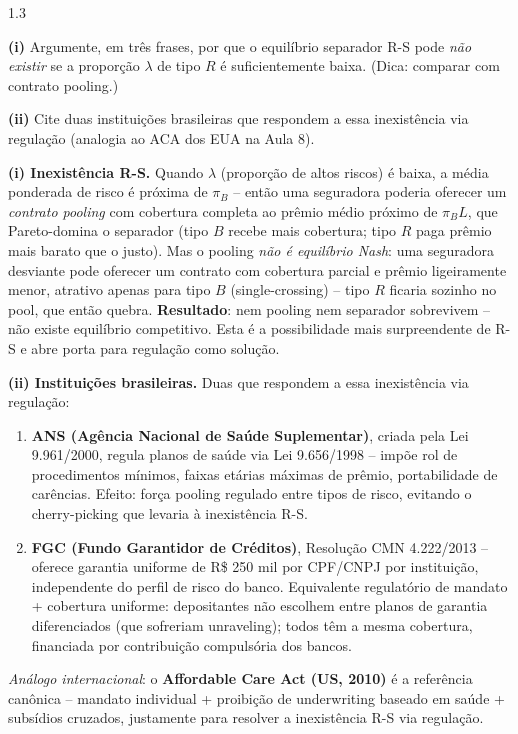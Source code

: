 \documentclass[11pt,addpoints]{exam}
\begin{document}
\begin{spacing}{1.3}
\begin{questions}
\begin{parts}
\textbf{(i)} Argumente, em três frases, por que o equilíbrio separador R-S pode \emph{não existir} se a proporção $\lambda$ de tipo $R$ é suficientemente baixa. (Dica: comparar com contrato pooling.)

\textbf{(ii)} Cite duas instituições brasileiras que respondem a essa inexistência via regulação (analogia ao ACA dos EUA na Aula 8).

\begin{solution}
\textbf{(i) Inexistência R-S.} Quando $\lambda$ (proporção de altos riscos) é baixa, a média ponderada de risco é próxima de $\pi_B$ -- então uma seguradora poderia oferecer um \emph{contrato pooling} com cobertura completa ao prêmio médio próximo de $\pi_B L$, que Pareto-domina o separador (tipo $B$ recebe mais cobertura; tipo $R$ paga prêmio mais barato que o justo). Mas o pooling \emph{não é equilíbrio Nash}: uma seguradora desviante pode oferecer um contrato com cobertura parcial e prêmio ligeiramente menor, atrativo apenas para tipo $B$ (single-crossing) -- tipo $R$ ficaria sozinho no pool, que então quebra. \textbf{Resultado}: nem pooling nem separador sobrevivem -- não existe equilíbrio competitivo. Esta é a possibilidade mais surpreendente de R-S e abre porta para regulação como solução.

\textbf{(ii) Instituições brasileiras.} Duas que respondem a essa inexistência via regulação:
\begin{enumerate}[noitemsep,topsep=0pt,leftmargin=*]
    \item \textbf{ANS (Agência Nacional de Saúde Suplementar)}, criada pela Lei 9.961/2000, regula planos de saúde via Lei 9.656/1998 -- impõe rol de procedimentos mínimos, faixas etárias máximas de prêmio, portabilidade de carências. Efeito: força pooling regulado entre tipos de risco, evitando o cherry-picking que levaria à inexistência R-S.
    \item \textbf{FGC (Fundo Garantidor de Créditos)}, Resolução CMN 4.222/2013 -- oferece garantia uniforme de R\$ 250 mil por CPF/CNPJ por instituição, independente do perfil de risco do banco. Equivalente regulatório de mandato + cobertura uniforme: depositantes não escolhem entre planos de garantia diferenciados (que sofreriam unraveling); todos têm a mesma cobertura, financiada por contribuição compulsória dos bancos.
\end{enumerate}
\emph{Análogo internacional}: o \textbf{Affordable Care Act (US, 2010)} é a referência canônica -- mandato individual + proibição de underwriting baseado em saúde + subsídios cruzados, justamente para resolver a inexistência R-S via regulação.
\end{solution}


\end{parts}
\end{questions}
\end{spacing}
\end{document}
